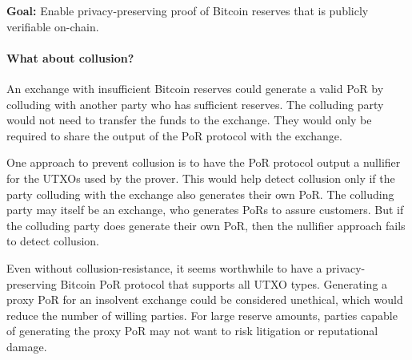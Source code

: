 \documentclass[10pt]{article}
\begin{document}
\textbf{Goal:} Enable privacy-preserving proof of Bitcoin reserves that is publicly verifiable on-chain. 

\paragraph{What about collusion?} An exchange with insufficient Bitcoin reserves could generate a valid PoR by colluding with another party who has sufficient reserves. The colluding party would not need to transfer the funds to the exchange. They would only be required to share the output of the PoR protocol with the exchange.

One approach to prevent collusion is to have the PoR protocol output a nullifier for the UTXOs used by the prover. This would help detect collusion only if the party colluding with the exchange also generates their own PoR. The colluding party may itself be an exchange, who generates PoRs to assure customers. But if the colluding party does generate their own PoR, then the nullifier approach fails to detect collusion.

Even without collusion-resistance, it seems worthwhile to have a privacy-preserving Bitcoin PoR protocol that supports all UTXO types. Generating a proxy PoR for an insolvent exchange could be considered unethical, which would reduce the number of willing parties. For large reserve amounts, parties capable of generating the proxy PoR may not want to risk litigation or reputational damage.
\end{document}

